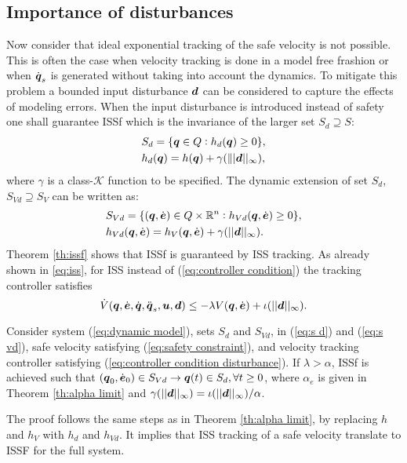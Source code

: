 \subsection{Importance of disturbances}
Now consider that ideal exponential tracking of the safe velocity is not possible. This is often the case when velocity tracking is done in a model free frashion or when $\dot{\boldsymbol{q}}_s$ is generated without taking into account the dynamics. To mitigate this problem a bounded input disturbance $\boldsymbol{d}$ can be considered to capture the effects of modeling errors. When the input disturbance is introduced instead of safety one shall guarantee ISSf which is the invariance of the larger set $S_d \supseteq S$:
\begin{equation} \label{eq:s d}
    \begin{split}
        &S_d = \{{\boldsymbol{q}} \in Q: h_d({\boldsymbol{q}})\geq 0 \},\\
        &h_d({\boldsymbol{q}})=h({\boldsymbol{q}}) + \gamma(\||\boldsymbol{d}||_\infty  ),
    \end{split}
\end{equation}
where $\gamma$ is a class-$\mathcal{K}$ function to be specified. 
The dynamic extension of set $S_d$, $S_{Vd}\supseteq S_{V}$ can be written as:
\begin{equation} \label{eq:s vd}
    \begin{split}
        &S_{Vd} = \{({\boldsymbol{q}},\dot{\boldsymbol{e}})\in Q \times \mathbb{R}^n: h_{Vd}({\boldsymbol{q}},\dot{\boldsymbol{e}})\geq 0\},\\
        &h_{Vd}({\boldsymbol{q}},\dot{\boldsymbol{e}}) = h_V({\boldsymbol{q}},\dot{\boldsymbol{e}})+\gamma(||\boldsymbol{d}||_\infty).
    \end{split}
\end{equation}
Theorem \ref{th:issf} shows that ISSf is guaranteed by ISS tracking. %
As already shown in \eqref{eq:iss}, for ISS instead of (\ref{eq:controller condition}) the tracking controller satisfies
\begin{equation} \label{eq:controller condition disturbance}
    \dot{V}({\boldsymbol{q}},\dot{\boldsymbol{e}},\dot{{\boldsymbol{q}}},\ddot{{\boldsymbol{q}}}_s,\boldsymbol{u},\boldsymbol{d}) \leq -\lambda V({\boldsymbol{q}},\dot{\boldsymbol{e}}) + \iota(||\boldsymbol{d}||_{\infty}).
\end{equation}
\begin{theorem}\label{th:issf}
    Consider system (\ref{eq:dynamic model}), sets $S_d$ and $S_{Vd}$, in (\ref{eq:s d}) and (\ref{eq:s vd}), safe velocity satisfying (\ref{eq:safety constraint}), and velocity tracking controller satisfying (\ref{eq:controller condition disturbance}). If $\lambda > \alpha$, ISSf is achieved such that $({\boldsymbol{q}}_0,\dot{\boldsymbol{e}}_0) \in S_{Vd} \rightarrow {\boldsymbol{q}}(t) \in S_d, \forall t \geq 0$, where $\alpha_e$ is given in Theorem \ref{th:alpha limit} and $\gamma(||\boldsymbol{d}||_\infty)=\iota(||\boldsymbol{d}||_\infty)/\alpha$.
\end{theorem}
\noindent
The proof follows the same steps as in Theorem \ref{th:alpha limit}, by replacing $h$ and $h_V$ with $h_d$ and $h_{Vd}$. It implies that ISS tracking of a safe velocity translate to ISSF for the full system.
